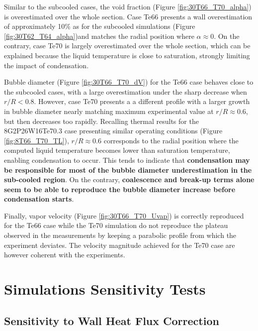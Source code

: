 Similar to the subcooled cases, the void fraction (Figure \ref{fig:30T66_T70_alpha}) is overestimated over the whole section. Case Te66 presents a wall overestimation of approximately 10\% as for the subcooled simulations (Figure \ref{fig:30T62_T64_alpha})and matches the radial position where $\alpha \approx 0$. On the contrary, case Te70 is largely overestimated over the whole section, which can be explained because the liquid temperature is close to saturation, strongly limiting the impact of condensation.

\npar

Bubble diameter (Figure \ref{fig:30T66_T70_dV}) for the Te66 case behaves close to the subcooled cases, with a large overestimation under the sharp decrease when $r/R < 0.8$. However, case Te70 presents a a different profile with a larger growth in bubble diameter nearly matching maximum experimental value at $r/R \approx 0.6$, but then decreases too rapidly. Recalling thermal results for the 8G2P26W16Te70.3 case presenting similar operating conditions (Figure \ref{fig:8T66_T70_TL}), $r/R \approx 0.6$ corresponds to the radial position where the computed liquid temperature becomes lower than saturation temperature, enabling condensation to occur. This tends to indicate that \textbf{condensation may be responsible for most of the bubble diameter underestimation in the sub-cooled region}. On the contrary, \textbf{coalescence and break-up terms alone seem to be able to reproduce the bubble diameter increase before condensation starts}.

\npar

Finally, vapor velocity (Figure \ref{fig:30T66_T70_Uvap}) is correctly reproduced for the Te66 case while the Te70 simulation do not reproduce the plateau observed in the measurements by keeping a parabolic profile from which the experiment deviates. The velocity magnitude achieved for the Te70 case are however coherent with the experiments. 


\section{Simulations Sensitivity Tests}


\subsection{Sensitivity to Wall Heat Flux Correction}





